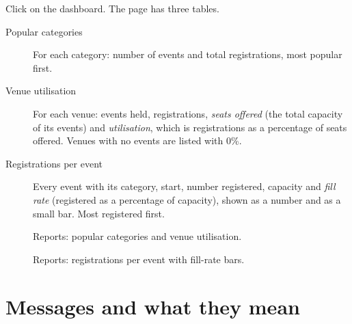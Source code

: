 \documentclass[11pt,a4paper]{article}
\begin{document}
Click  on the dashboard. The page has three tables.

\begin{description}
  \item[Popular categories] For each category: number of events and total registrations, most
        popular first.
  \item[Venue utilisation] For each venue: events held, registrations, \emph{seats offered} (the
        total capacity of its events) and \emph{utilisation}, which is registrations as a
        percentage of seats offered. Venues with no events are listed with 0\%.
  \item[Registrations per event] Every event with its category, start, number registered,
        capacity and \emph{fill rate} (registered as a percentage of capacity), shown as a number
        and as a small bar. Most registered first.
\end{description}

\begin{figure}[H]
\centering
{}
\caption{Reports: popular categories and venue utilisation.}
\end{figure}

\begin{figure}[H]
\centering
{}
\caption{Reports: registrations per event with fill-rate bars.}
\end{figure}

\section{Messages and what they mean}
\label{sec:messages}
\end{document}
